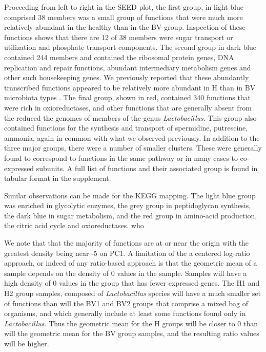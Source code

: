 \documentclass[10pt,letterpaper]{article}
\begin{document}
Proceeding from left to right in the SEED plot, the first group, in light blue comprised 38 members was a small group of functions that were much more relatively abundant in the healthy than in the BV group. Inspection of these functions shows that there are 12 of 38 members were sugar transport or utilization and phosphate transport components. The second group in dark blue contained 244 members and  contained the ribosomal protein genes, DNA replication and repair functions, abundant intermediary metabolism genes and other such housekeeping genes. We previously reported that these abundantly transcribed functions appeared to be relatively more abundant in H than in BV microbiota types \cite{macklaim:2013}. The final group, shown in red, contained 340 functions  that were rich in oxioreductases, and other functions that are generally absent from the reduced the genomes of members of the genus \emph{Lactobacillus}. This group also contained functions for the synthesis and transport of spermidine, putrescine, ammonia, again in common with what we observed previously. In addition to the three major groups, there were a number of smaller clusters. These were generally found to correspond to functions in the same pathway or in many cases to co-expressed subunits.  A full list of functions and their associated group is found in tabular format in the supplement. 

Similar observations can be made for the KEGG mapping. The light blue group was enriched in glycolytic enzymes, the grey group in peptidoglycan synthesis, the dark blue in sugar metabolism, and the red group in amino-acid production, the citric acid cycle and oxioreductases.  who

We note that that the majority of functions are at or near the origin with the greatest density being near -5 on PC1. A limitation of the a centered log-ratio approach, or indeed of any ratio-based approach is that the geometric mean of a sample depends on the density of 0 values in the sample.  Samples will have a high density of 0 values in the group that has fewer expressed genes. The H1 and H2 group samples, composed of \emph{Lactobacillus} species will have a much smaller set of functions than will the BV1 and BV2 groups that comprise a mixed bag of organisms, and which generally include at least some functions found only in \emph{Lactobacillus}. Thus the geometric mean for the H groups will be closer to 0 than will the geometric mean for the BV group samples, and the resulting ratio values will be higher. 
\end{document}
